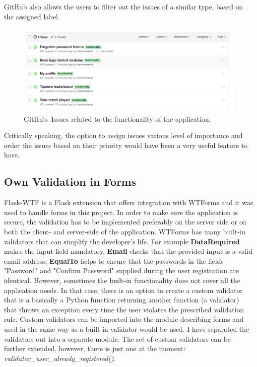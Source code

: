 GitHub also allows the users to filter out the issues of a similar type, based on the assigned label.

\begin{figure}[H]
	\begin{center}
		\includegraphics[width=.90\textwidth]{impl/images/githubFunctionalityIssues}
		\caption{GitHub. Issues related to the functionality of the application.} \label{fig:using:githubfunctionalityissues}
	\end{center}
\end{figure}

Critically speaking, the option to assign issues various level of importance and order the issues based on their priority would have been a very useful feature to have.

\subsection{Own Validation in Forms}
\label{subsec:validations}
Flask-WTF is a Flask extension that offers integration with WTForms and it was used to handle forms in this project. In order to make sure the application is secure, the validation has to be implemented preferably on the server side or on both the client- and server-side of the application. WTForms has many built-in validators that can simplify the developer's life. For example \textbf{DataRequired} makes the input field mandatory, \textbf{Email} checks that the provided input is a valid email address, \textbf{EqualTo} helps to ensure that the passwords in the fields "Password" and "Confirm Password" supplied during the user registration are identical. However, sometimes the built-in functionality does not cover all the application needs. In that case, there is an option to create a custom validator that is a basically a Python function returning another function (a validator) that throws an exception every time the user violates the prescribed validation rule. Custom validators can be imported into the module describing forms and used in the same way as a built-in validator would be used. I have separated the validators out into a separate module. The set of custom validators can be further extended, however, there is just one at the moment: \emph{validator\_user\_already\_registered()}.

